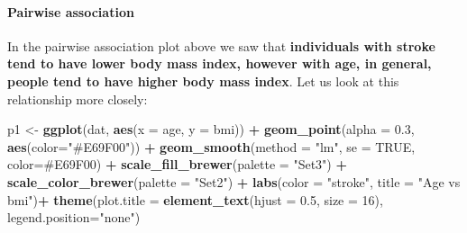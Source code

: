 \documentclass[
]{article}
\newenvironment{Shaded}{\begin{snugshade}}{\end{snugshade}}
\newcommand{\AttributeTok}[1]{\textcolor[rgb]{0.13,0.29,0.53}{#1}}
\newcommand{\ConstantTok}[1]{\textcolor[rgb]{0.56,0.35,0.01}{#1}}
\newcommand{\DecValTok}[1]{\textcolor[rgb]{0.00,0.00,0.81}{#1}}
\newcommand{\FloatTok}[1]{\textcolor[rgb]{0.00,0.00,0.81}{#1}}
\newcommand{\FunctionTok}[1]{\textcolor[rgb]{0.13,0.29,0.53}{\textbf{#1}}}
\newcommand{\NormalTok}[1]{#1}
\newcommand{\OtherTok}[1]{\textcolor[rgb]{0.56,0.35,0.01}{#1}}
\newcommand{\SpecialCharTok}[1]{\textcolor[rgb]{0.81,0.36,0.00}{\textbf{#1}}}
\newcommand{\StringTok}[1]{\textcolor[rgb]{0.31,0.60,0.02}{#1}}
\begin{document}
\paragraph{\texorpdfstring{\textbf{Pairwise
association}}{Pairwise association}}\label{pairwise-association}

In the pairwise association plot above we saw that \textbf{individuals
with stroke tend to have lower body mass index, however with age, in
general, people tend to have higher body mass index}. Let us look at
this relationship more closely:

\begin{Shaded}
\begin{Highlighting}[]
\NormalTok{p1 }\OtherTok{\textless{}{-}} \FunctionTok{ggplot}\NormalTok{(dat, }\FunctionTok{aes}\NormalTok{(}\AttributeTok{x =}\NormalTok{ age, }\AttributeTok{y =}\NormalTok{ bmi)) }\SpecialCharTok{+}
      \FunctionTok{geom\_point}\NormalTok{(}\AttributeTok{alpha =} \FloatTok{0.3}\NormalTok{, }\FunctionTok{aes}\NormalTok{(}\AttributeTok{color=}\StringTok{"\#E69F00"}\NormalTok{)) }\SpecialCharTok{+}
      \FunctionTok{geom\_smooth}\NormalTok{(}\AttributeTok{method =} \StringTok{"lm"}\NormalTok{, }\AttributeTok{se =} \ConstantTok{TRUE}\NormalTok{, }\AttributeTok{color=}\StringTok{\textquotesingle{}\#E69F00\textquotesingle{}}\NormalTok{) }\SpecialCharTok{+}
      \FunctionTok{scale\_fill\_brewer}\NormalTok{(}\AttributeTok{palette =} \StringTok{"Set3"}\NormalTok{) }\SpecialCharTok{+}
      \FunctionTok{scale\_color\_brewer}\NormalTok{(}\AttributeTok{palette =} \StringTok{"Set2"}\NormalTok{) }\SpecialCharTok{+}
      \FunctionTok{labs}\NormalTok{(}\AttributeTok{color =} \StringTok{"stroke"}\NormalTok{, }\AttributeTok{title =} \StringTok{"Age vs bmi"}\NormalTok{)}\SpecialCharTok{+}
      \FunctionTok{theme}\NormalTok{(}\AttributeTok{plot.title =} \FunctionTok{element\_text}\NormalTok{(}\AttributeTok{hjust =} \FloatTok{0.5}\NormalTok{, }\AttributeTok{size =} \DecValTok{16}\NormalTok{), }\AttributeTok{legend.position=}\StringTok{"none"}\NormalTok{)}



\end{Highlighting}
\end{Shaded}
\end{document}
